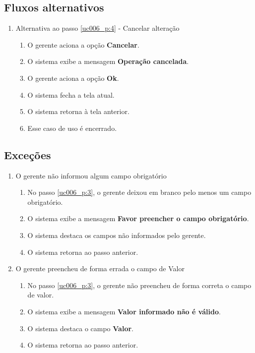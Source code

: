 \subsection{Fluxos alternativos}

\begin{enumerate}
	\item Alternativa ao passo \ref{uc006_p:4} - Cancelar alteração \label{uc006_a:2}
	\begin{enumerate}[label*=.\arabic*]
		\item O gerente aciona a opção \textbf{Cancelar}.
		\item O sistema exibe a mensagem \textbf{Operação cancelada}.
		\item O gerente aciona a opção \textbf{Ok}.
		\item O sistema fecha a tela atual.
		\item O sistema retorna à tela anterior.
		\item Esse caso de uso é encerrado.
	\end{enumerate}	
\end{enumerate}

\subsection{Exceções}

\begin{enumerate}[label=E\arabic*]	
	\item O gerente não informou algum campo obrigatório \label{uc006_e:1}
	\begin{enumerate}[label*=.\arabic*]
		\item[] No passo \ref{uc006_p:3}, o gerente deixou em branco pelo menos um campo obrigatório.
		\item O sistema exibe a mensagem \textbf{Favor preencher o campo obrigatório}.
		\item O sistema destaca os campos não informados pelo gerente.
		\item O sistema retorna ao passo anterior.
	\end{enumerate}
	
	\item O gerente preencheu de forma errada o campo de Valor \label{uc006_e:2}
	\begin{enumerate}[label*=.\arabic*]		
		\item[] No passo \ref{uc006_p:3}, o gerente não preencheu de forma correta o campo de valor.		
		\item O sistema exibe a mensagem \textbf{Valor informado não é válido}.
		\item O sistema destaca o campo \textbf{Valor}.
		\item O sistema retorna ao passo anterior.
	\end{enumerate}
\end{enumerate}

